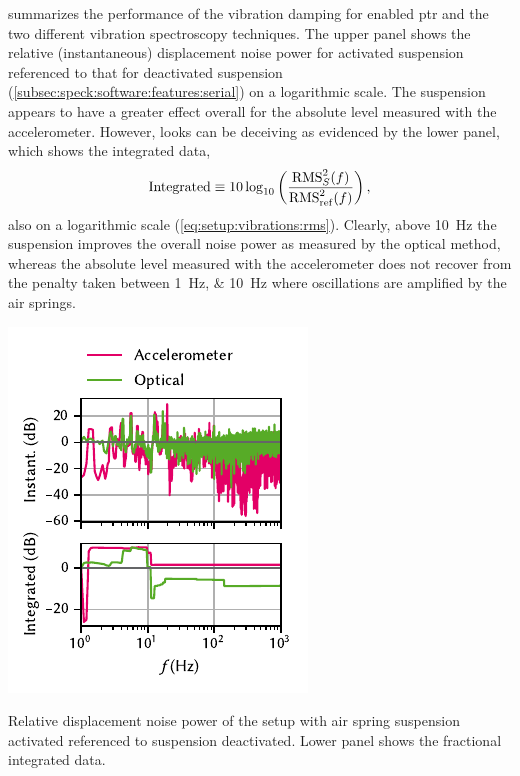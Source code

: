  summarizes the performance of the vibration damping for enabled \gls{ptr} and the two different vibration spectroscopy techniques.
The upper panel shows the relative (instantaneous) displacement noise power for activated suspension referenced to that for deactivated suspension (\cf \cref{subsec:speck:software:features:serial}) on a logarithmic scale.
The suspension appears to have a greater effect overall for the absolute level measured with the accelerometer.
However, looks can be deceiving as evidenced by the lower panel, which shows the integrated data,
\begin{equation}
    \mathrm{Integrated} \equiv 10\log_{10}\left(\frac{\operatorname{RMS}_{S}^2(f)}{\operatorname{RMS}_{\mathrm{ref}}^2(f)}\right),
\end{equation}
also on a logarithmic scale (\cf \cref{eq:setup:vibrations:rms}).
Clearly, above \qty{10}{\hertz} the suspension improves the overall noise power as measured by the optical method, whereas the absolute level measured with the accelerometer does not recover from the penalty taken between \qtylist{1;10}{\hertz} where oscillations are amplified by the air springs.

\begin{marginfigure}[*-15]
    \centering
    \includegraphics{img/pdf/setup/spect_dB}
    \caption[]{
        Relative displacement noise power of the setup with air spring suspension activated referenced to suspension deactivated.
        Lower panel shows the fractional integrated data.
    }
    \label{fig:setup:conclusion:vibrations}
\end{marginfigure}

